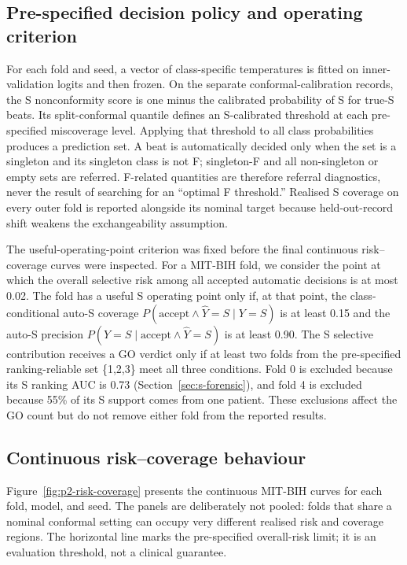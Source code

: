 \documentclass[pdflatex,sn-mathphys-num]{sn-jnl}
\begin{document}
\subsection{Pre-specified decision policy and operating criterion}
For each fold and seed, a vector of class-specific temperatures is fitted on
inner-validation logits and then frozen. On the separate conformal-calibration
records, the S nonconformity score is one minus the calibrated probability of S
for true-S beats. Its split-conformal quantile defines an S-calibrated threshold
at each pre-specified miscoverage level. Applying that threshold to all class
probabilities produces a prediction set. A beat is automatically decided only
when the set is a singleton and its singleton class is not F; singleton-F and
all non-singleton or empty sets are referred. F-related quantities are therefore
referral diagnostics, never the result of searching for an ``optimal F
threshold.'' Realised S coverage on every outer fold is reported alongside its
nominal target because held-out-record shift weakens the exchangeability assumption.

The useful-operating-point criterion was fixed before the final continuous
risk--coverage curves were inspected. For a MIT-BIH fold, we consider the point
at which the overall selective risk among all accepted automatic decisions is
at most 0.02. The fold has a useful S operating point only if, at that point,
the class-conditional auto-S coverage
$P(\mathrm{accept}\land\widehat{Y}=S\mid Y=S)$ is at least 0.15 and the auto-S
precision $P(Y=S\mid\mathrm{accept}\land\widehat{Y}=S)$ is at least 0.90.
The S selective contribution receives a GO verdict only if at least two folds
from the pre-specified ranking-reliable set \{1,2,3\} meet all three conditions.
Fold 0 is excluded because its S ranking AUC is 0.73
(Section~\ref{sec:s-forensic}), and fold 4 is excluded
because 55\% of its S support comes from one patient. These exclusions affect
the GO count but do not remove either fold from the reported results.
\subsection{Continuous risk--coverage behaviour}
Figure~\ref{fig:p2-risk-coverage} presents the continuous MIT-BIH curves for
each fold, model, and seed. The panels are deliberately not pooled: folds that
share a nominal conformal setting can occupy very different realised risk and
coverage regions. The horizontal line marks the pre-specified overall-risk
limit; it is an evaluation threshold, not a clinical guarantee.
\end{document}
